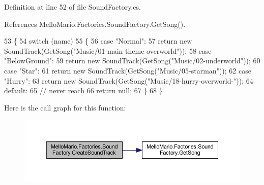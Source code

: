 Definition at line 52 of file Sound\+Factory.\+cs.



References Mello\+Mario.\+Factories.\+Sound\+Factory.\+Get\+Song().


\begin{DoxyCode}
53         \{
54             \textcolor{keywordflow}{switch} (name)
55             \{
56                 \textcolor{keywordflow}{case} \textcolor{stringliteral}{"Normal"}:
57                     \textcolor{keywordflow}{return} \textcolor{keyword}{new} SoundTrack(GetSong(\textcolor{stringliteral}{"Music/01-main-theme-overworld"}));
58                 \textcolor{keywordflow}{case} \textcolor{stringliteral}{"BelowGround"}:
59                     \textcolor{keywordflow}{return} \textcolor{keyword}{new} SoundTrack(GetSong(\textcolor{stringliteral}{"Music/02-underworld"}));
60                 \textcolor{keywordflow}{case} \textcolor{stringliteral}{"Star"}:
61                     \textcolor{keywordflow}{return} \textcolor{keyword}{new} SoundTrack(GetSong(\textcolor{stringliteral}{"Music/05-starman"}));
62                 \textcolor{keywordflow}{case} \textcolor{stringliteral}{"Hurry"}:
63                     \textcolor{keywordflow}{return} \textcolor{keyword}{new} SoundTrack(GetSong(\textcolor{stringliteral}{"Music/18-hurry-overworld-"}));
64                 \textcolor{keywordflow}{default}:
65                     \textcolor{comment}{// never reach}
66                     \textcolor{keywordflow}{return} null;
67             \}
68         \}
\end{DoxyCode}
Here is the call graph for this function\+:
\nopagebreak
\begin{figure}[H]
\begin{center}
\leavevmode
\includegraphics[width=350pt]{classMelloMario_1_1Factories_1_1SoundFactory_a9685c5210ea5d63e627954b453301514_cgraph}
\end{center}
\end{figure}
\mbox{\label{classMelloMario_1_1Factories_1_1SoundFactory_ab9247506e33819710479a9f77c6da6d8}} 
